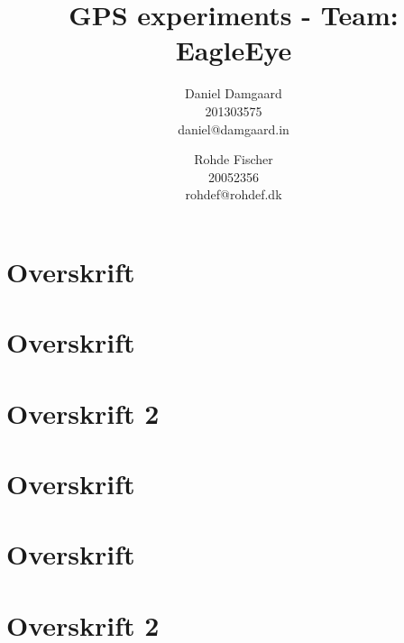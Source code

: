 \documentclass[10pt,a4paper,twocolumn]{article}
\author{Daniel Damgaard \\
201303575 \\
daniel@damgaard.in
\and
Rohde Fischer \\
20052356 \\
rohdef@rohdef.dk
}
\title{GPS experiments - Team: EagleEye}
\begin{document}
\maketitle

\tableofcontents

\section{Overskrift}


\section{Overskrift}


\section{Overskrift 2}


\section{Overskrift}


\section{Overskrift}


\section{Overskrift 2}

\end{document}
